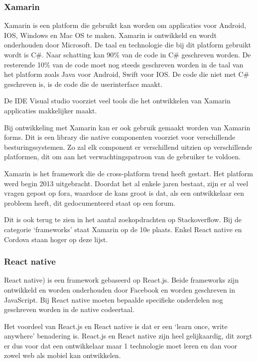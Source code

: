 		
	\subsubsection{Xamarin}
		Xamarin is een platform die gebruikt kan worden om applicaties voor Android, IOS, Windows en Mac OS te maken.  Xamarin is ontwikkeld en wordt onderhouden door Microsoft. De taal en technologie die bij dit platform gebruikt wordt is C\#. Naar schatting kan 90\% van de code in C\# geschreven worden. De resterende 10\% van de code moet nog steeds geschreven worden in de taal van het platform zoals Java voor Android, Swift voor IOS. De code die niet met C\# geschreven is, is de code die de userinterface maakt.
		\autocite{Altexsoft2019} \autocite{Warcholinski2020}
		
		De IDE Visual studio voorziet veel tools die het ontwikkelen van Xamarin applicaties makkelijker maakt.
		\autocite{VisualStudio2020}
		
		
		Bij ontwikkeling met Xamarin kan er ook gebruik gemaakt worden van Xamarin forms. Dit is een library die native componenten voorziet voor verschillende besturingssystemen. Zo zal elk component er verschillend uitzien op verschillende platformen, dit om aan het verwachtingspatroon van de gebruiker te voldoen.
		\autocite{Microsoft2019}
	
		Xamarin is het framework die de cross-platform trend heeft gestart. Het platform werd begin 2013 uitgebracht. Doordat het al enkele jaren bestaat, zijn er al veel vragen gepost op fora, waardoor de kans groot is dat, als een ontwikkelaar een probleem heeft, dit gedocumenteerd staat op een forum.
		
		Dit is ook terug te zien in het aantal zoekopdrachten op Stackoverflow. Bij de categorie ‘frameworks’ staat Xamarin op de 10e plaats. Enkel React native en Cordova staan hoger op deze lijst.
		\autocite{StackOverflow2020}
		
	\subsubsection{React native}
		React native\autocite{Reactnative2020}) is een framework gebaseerd op React.js. Beide frameworks zijn ontwikkeld en worden onderhouden door Facebook en worden geschreven in JavaScript. Bij React native moeten bepaalde specifieke onderdelen nog geschreven worden in de native codeertaal. 
		
		Het voordeel van React.js en React native is dat er een ‘learn once, write anywhere’ benadering is. React.js en React native zijn heel gelijkaardig, dit zorgt er dus voor dat een ontwikkelaar maar 1 technologie moet leren en dan voor zowel web als mobiel kan ontwikkelen.
		

